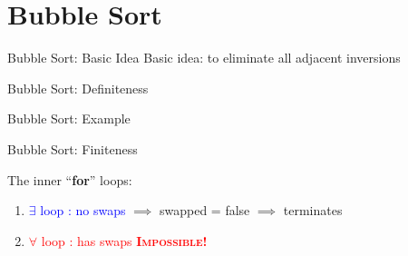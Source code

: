 \section{Bubble Sort}

\begin{frame}{Bubble Sort: Basic Idea}
  Basic idea: to eliminate all adjacent inversions
  \pause

  
\end{frame}
\begin{frame}{Bubble Sort: Definiteness}
  
\end{frame}
\begin{frame}{Bubble Sort: Example}

  \begin{center}
	
  \end{center}

\end{frame}
\begin{frame}{Bubble Sort: Finiteness}
  \begin{center}
  \end{center}

  The inner ``{\bf for}'' loops:
  \begin{enumerate}[1)]
	\item \textcolor{blue}{$\exists$ loop : no swaps} $\implies$ swapped = false $\implies$ terminates
	  \pause
	\item \textcolor{red}{$\forall$ loop : has swaps} \pause \qquad \textcolor{red}{\bf \textsc{Impossible}!}
  \end{enumerate}
\end{frame}
